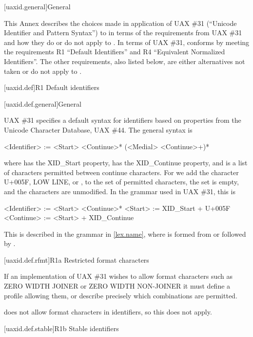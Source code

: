 
[uaxid.general]{General}

\pnum
This Annex describes the choices made in application of
UAX \#31 (``Unicode Identifier and Pattern Syntax'')
to \Cpp{} in terms of the requirements from UAX \#31 and
how they do or do not apply to \Cpp{}.
In terms of UAX \#31,
\Cpp{} conforms by meeting the requirements
R1 ``Default Identifiers'' and
R4 ``Equivalent Normalized Identifiers''.
The other requirements, also listed below,
are either alternatives not taken or do not apply to \Cpp{}.

[uaxid.def]{R1 Default identifiers}

[uaxid.def.general]{General}

\pnum
UAX \#31 specifies a default syntax for identifiers
based on properties from the Unicode Character Database, UAX \#44.
The general syntax is
\begin{codeblock}
<Identifier> := <Start> <Continue>* (<Medial> <Continue>+)*
\end{codeblock}
where  has the XID_Start property,
 has the XID_Continue property, and
 is a list of characters permitted between continue characters.
For \Cpp{} we add the character U+005F, LOW LINE, or \tcode{_},
to the set of permitted  characters,
the  set is empty, and
the  characters are unmodified.
In the grammar used in UAX \#31, this is
\begin{codeblock}
<Identifier> := <Start> <Continue>*
<Start> := XID_Start + U+005F
<Continue> := <Start> + XID_Continue
\end{codeblock}

\pnum
This is described in the \Cpp{} grammar in \ref{lex.name},
where  is formed from
 or
 followed by .

[uaxid.def.rfmt]{R1a Restricted format characters}

\pnum
If an implementation of UAX \#31 wishes to allow format characters
such as ZERO WIDTH JOINER or ZERO WIDTH NON-JOINER
it must define a profile allowing them, or
describe precisely which combinations are permitted.

\pnum
\Cpp{} does not allow format characters in identifiers, so this does not apply.

[uaxid.def.stable]{R1b Stable identifiers}

